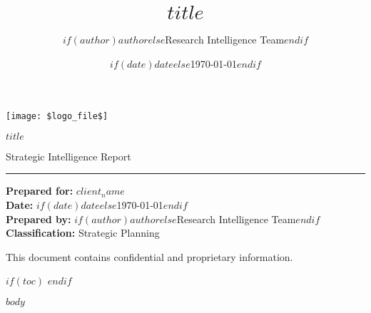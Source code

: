\documentclass[11pt]{article}
\title{$title$}
\author{$if(author)$$author$$else$Research Intelligence Team$endif$}
\date{$if(date)$$date$$else$\today$endif$}
\begin{document}
\begin{titlepage}
    \centering
    \vspace*{0.5in}
    
    \texttt{[image: \$logo\_file\$]}
    
    \vspace{1in}
    
    {\Huge\bfseries\color{PharosBlue} $title$ \par}
    
    \vspace{0.5in}
    
    {\Large\color{PharosGray} Strategic Intelligence Report \par}
    
    \vspace{0.8in}
    
    \textcolor{PharosBlue}{\rule{4in}{2pt}}
    
    \vspace{0.8in}
    
    {\large
    \textbf{Prepared for:} $client_name$ \\[0.3cm]
    \textbf{Date:} $if(date)$$date$$else$\today$endif$ \\[0.3cm]
    \textbf{Prepared by:} $if(author)$$author$$else$Research Intelligence Team$endif$ \\[0.3cm]
    \textbf{Classification:} Strategic Planning
    }
    
    \vfill
    
    {\small\color{PharosGray}
    This document contains confidential and proprietary information.
    }
    
\end{titlepage}

\thispagestyle{empty}
\setcounter{page}{1}

$if(toc)$
\tableofcontents
\newpage
$endif$

$body$
\end{document}

